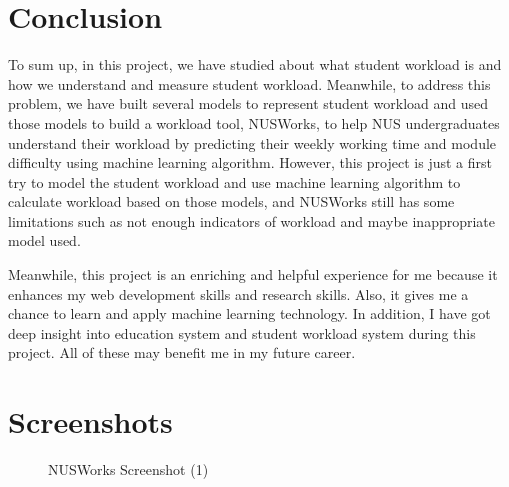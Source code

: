 \documentclass[fyp]{socreport}
\begin{document}
\chapter{Conclusion}
To sum up, in this project, we have studied about what student workload is and how we understand and measure student workload. Meanwhile, to address this problem, we have built several models to represent student workload and used those models to build a workload tool, NUSWorks, to help NUS undergraduates understand their workload by predicting their weekly working time and module difficulty using machine learning algorithm. However, this project is just a first try to model the student workload and use machine learning algorithm to calculate workload based on those models, and NUSWorks still has some limitations such as not enough indicators of workload and maybe inappropriate model used.

Meanwhile, this project is an enriching and helpful experience for me because it enhances my web development skills and research skills. Also, it gives me a chance to learn and apply machine learning technology. In addition, I have got deep insight into education system and student workload system during this project. All of these may benefit me in my future career.

\nocite{*}



\appendix
\chapter{Screenshots}
\begin{figure}
\caption{NUSWorks Screenshot (1)}
\label{screen-1}
\end{figure}
\end{document}
